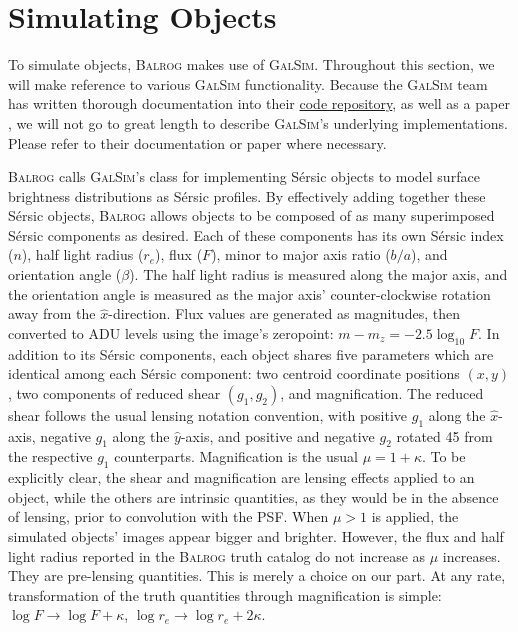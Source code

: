 \documentclass[11pt]{book}
\newcommand{\galsim}{\textsc{GalSim}}
\newcommand{\balrog}{\textsc{Balrog}}
\newcommand{\sersic}{S\'{e}rsic}
\begin{document}


\section{Simulating Objects}
\label{sec:galsim}

To simulate objects, \balrog{} makes use of \galsim{}. 
Throughout this section, we will make reference to various \galsim{} functionality.
Because the \galsim{} team has written thorough documentation into their 
\href{https://github.com/GalSim-developers/GalSim}{code repository},
as well as a paper \citep{galsim}, 
we will not go to great length to describe \galsim{}'s underlying implementations.
Please refer to their documentation or paper where necessary.

\balrog{} calls \galsim{}'s class for implementing \sersic{} objects to model surface brightness distributions as \sersic{} profiles. 
By effectively adding together these \sersic{} objects, \balrog{} allows objects to be composed of as many superimposed
\sersic{} components as desired. Each of these components has its own \sersic{} index ($n$), half light radius ($r_e$), flux ($F$),
minor to major axis ratio ($b/a$), and orientation angle ($\beta$). The half light radius is measured along
the major axis, and the orientation angle is measured as the major axis' counter-clockwise rotation
away from the $\hat{x}$-direction. 
Flux values are generated as magnitudes, then converted to ADU levels using the image's zeropoint:
$m - m_ z = -2.5 \log_{10} F$.
In addition to its \sersic{} components, each object
shares five parameters which are identical among each \sersic{} component:
two centroid coordinate positions $(x, y)$, two components of reduced shear $(g_1, g_2)$, and magnification.
The reduced shear follows the usual lensing notation convention, with positive $g_1$ along the $\hat{x}$-axis,
negative $g_1$ along the $\hat{y}$-axis, and positive and negative $g_2$ rotated 45\degree{} from the
respective $g_1$ counterparts. Magnification is the usual $\mu = 1 + \kappa$.
To be explicitly clear, the shear and magnification are lensing effects applied to an object,
while the others are intrinsic quantities, as they would be in the absence of lensing, prior to convolution with the PSF.
When $\mu > 1$ is applied, the simulated objects' images appear bigger and brighter.
However, the flux and half light radius reported in the \balrog{} truth catalog do not increase as $\mu$ increases.
They are pre-lensing quantities. This is merely a choice on our part. 
At any rate, transformation of the truth quantities through magnification is simple: 
$\log F \rightarrow \log F + \kappa$, $\log r_e \rightarrow \log r_e + 2 \kappa$.
\end{document}
